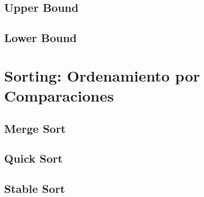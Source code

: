 \documentclass[12pt, fleqn]{report}                             %
\theoremstyle{break}                                            %
\begin{document}
        \section{Upper Bound}

        \section{Lower Bound}

    \clearpage
    \chapter{Sorting: Ordenamiento por Comparaciones}


        \section{Merge Sort}

        \section{Quick Sort}

        \section{Stable Sort}

\end{document}
